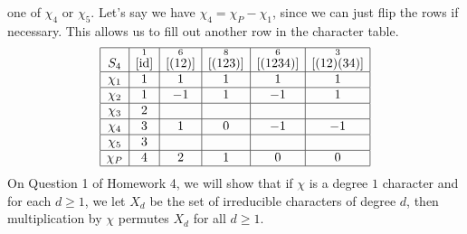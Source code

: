 \begin{exmp}{}
    one of $\chi_4$ or $\chi_5$. Let's say we have $\chi_4 = \chi_P - \chi_1$, since we 
    can just flip the rows if necessary. This allows us to fill out another row in 
    the character table. 
    \begin{align*}
        \begin{array}{|c|c|c|c|c|c|}
            \hline
            S_4    & \overset{1}{[\operatorname{id}]} & \overset{6}{[(12)]} & \overset{8}{[(123)]} & \overset{6}{[(1234)]} & \overset{3}{[(12)(34)]} \\ \hline
            \chi_1 & 1                  & 1                   & 1                    & 1                     & 1                       \\ \hline
            \chi_2 & 1                  & -1                  & 1                    & -1                    & 1                       \\ \hline
            \chi_3 & 2                  &                     &                      &                       &                         \\ \hline
            \chi_4 & 3                  & 1                   & 0                    & -1                    & -1                      \\ \hline
            \chi_5 & 3                  &                     &                      &                       &                         \\ \hline
            \chi_P & 4                  & 2                   & 1                    & 0                     & 0                       \\ \hline 
        \end{array} 
    \end{align*}
    On Question 1 of Homework 4, we will show that if $\chi$ is a degree $1$ 
    character and for each $d \geq 1$, we let $X_d$ be the set of irreducible 
    characters of degree $d$, then multiplication by $\chi$ permutes $X_d$ 
    for all $d \geq 1$. 


\end{exmp}
